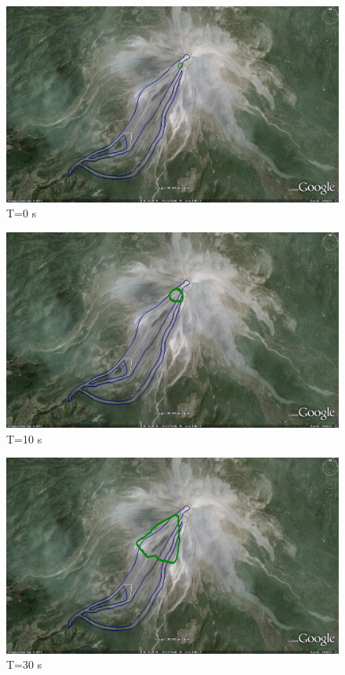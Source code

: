 \documentclass[letterpaper,10pt]{article}
\begin{document}
\begin{figure}[H]
\centerline{\includegraphics[width=.9\textwidth]{IMAGES/pics/phase0.jpg}}
\caption{T=0 s}
\label{yextent}
\end{figure}
\begin{figure}[H]
\centerline{\includegraphics[width=.9\textwidth]{IMAGES/pics/phase1.jpg}}
\caption{T=10 s}
\label{yextent}
\end{figure}
\begin{figure}[H]
\centerline{\includegraphics[width=.9\textwidth]{IMAGES/pics/phase3.jpg}}
\caption{T=30 s}
\label{yextent}
\end{figure}
\end{document}
